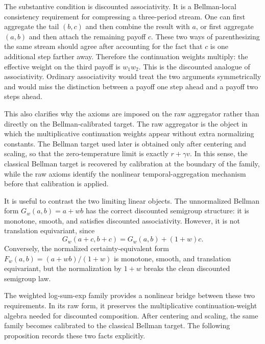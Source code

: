 \documentclass{article}
\theoremstyle{remark}
\begin{document}
The substantive condition is discounted associativity. It is a Bellman-local consistency requirement
for compressing a three-period stream. One can first aggregate the tail $(b,c)$ and then combine the
result with $a$, or first aggregate $(a,b)$ and then attach the remaining payoff $c$. These two ways of
parenthesizing the same stream should agree after accounting for the fact that $c$ is one additional
step farther away. Therefore the continuation weights multiply: the effective weight on the third
payoff is $w_1w_2$. This is the discounted analogue of associativity. Ordinary associativity would
treat the two arguments symmetrically and would miss the distinction between a payoff one step
ahead and a payoff two steps ahead.

This also clarifies why the axioms are imposed on the raw aggregator rather than directly on the
Bellman-calibrated target. The raw aggregator is the object in which the multiplicative continuation
weights appear without extra normalizing constants. The Bellman target used later is obtained only
after centering and scaling, so that the zero-temperature limit is exactly $r+\gamma v$. In this sense,
the classical Bellman target is recovered by calibration at the boundary of the family, while the raw
axioms identify the nonlinear temporal-aggregation mechanism before that calibration is applied.

It is useful to contrast the two limiting linear objects. The unnormalized Bellman form
$G_w(a,b)=a+wb$ has the correct discounted semigroup structure: it is monotone, smooth, and
satisfies discounted associativity. However, it is not translation equivariant, since
\[
G_w(a+c,b+c)=G_w(a,b)+(1+w)c.
\]
Conversely, the normalized certainty-equivalent form
$F_w(a,b)=(a+wb)/(1+w)$ is monotone, smooth, and translation equivariant, but the normalization
by $1+w$ breaks the clean discounted semigroup law.

The weighted log-sum-exp family provides a nonlinear bridge between these two requirements. In
its raw form, it preserves the multiplicative continuation-weight algebra needed for discounted
composition. After centering and scaling, the same family becomes calibrated to the classical
Bellman target. The following proposition records these two facts explicitly.
\end{document}
